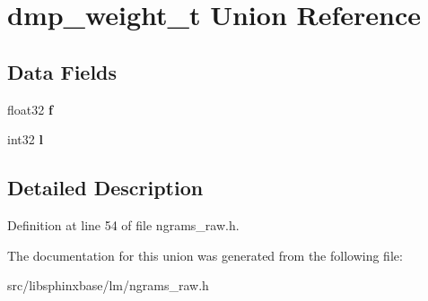 \section{dmp\-\_\-weight\-\_\-t Union Reference}
\label{uniondmp__weight__t}
\subsection*{Data Fields}
\begin{DoxyCompactItemize}
\item 
float32 {\bfseries f}\label{uniondmp__weight__t_ac41dfac7e4cf5085a9266fd3989d6c2b}

\item 
int32 {\bfseries l}\label{uniondmp__weight__t_ae13454a86a50d88b50e0e23c6dcea109}

\end{DoxyCompactItemize}


\subsection{Detailed Description}


Definition at line 54 of file ngrams\-\_\-raw.\-h.



The documentation for this union was generated from the following file\-:\begin{DoxyCompactItemize}
\item 
src/libsphinxbase/lm/ngrams\-\_\-raw.\-h\end{DoxyCompactItemize}
